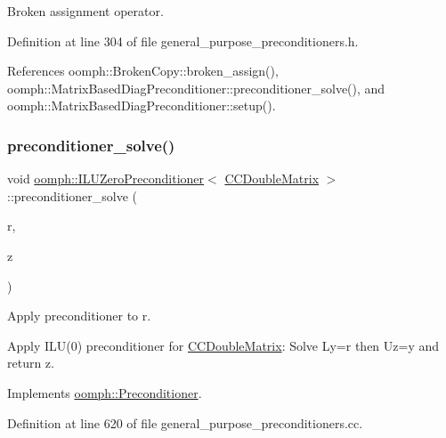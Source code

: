 Broken assignment operator. 



Definition at line 304 of file general\+\_\+purpose\+\_\+preconditioners.\+h.



References oomph\+::\+Broken\+Copy\+::broken\+\_\+assign(), oomph\+::\+Matrix\+Based\+Diag\+Preconditioner\+::preconditioner\+\_\+solve(), and oomph\+::\+Matrix\+Based\+Diag\+Preconditioner\+::setup().

\mbox{\label{classoomph_1_1ILUZeroPreconditioner_3_01CCDoubleMatrix_01_4_adadad5eca4d828d3d8a07547d83bd9a6}} 
\subsubsection{\texorpdfstring{preconditioner\+\_\+solve()}{preconditioner\_solve()}}
{\footnotesize\ttfamily void \hyperlink{classoomph_1_1ILUZeroPreconditioner}{oomph\+::\+I\+L\+U\+Zero\+Preconditioner}$<$ \hyperlink{classoomph_1_1CCDoubleMatrix}{C\+C\+Double\+Matrix} $>$\+::preconditioner\+\_\+solve (\begin{DoxyParamCaption}\item[{const \hyperlink{classoomph_1_1DoubleVector}{Double\+Vector} \&}]{r,  }\item[{\hyperlink{classoomph_1_1DoubleVector}{Double\+Vector} \&}]{z }\end{DoxyParamCaption})\hspace{0.3cm}{\ttfamily [virtual]}}



Apply preconditioner to r. 

Apply I\+L\+U(0) preconditioner for \hyperlink{classoomph_1_1CCDoubleMatrix}{C\+C\+Double\+Matrix}\+: Solve Ly=r then Uz=y and return z. 

Implements \hyperlink{classoomph_1_1Preconditioner_ace1199369e4465cd2b9a34884bb64ec8}{oomph\+::\+Preconditioner}.



Definition at line 620 of file general\+\_\+purpose\+\_\+preconditioners.\+cc.



